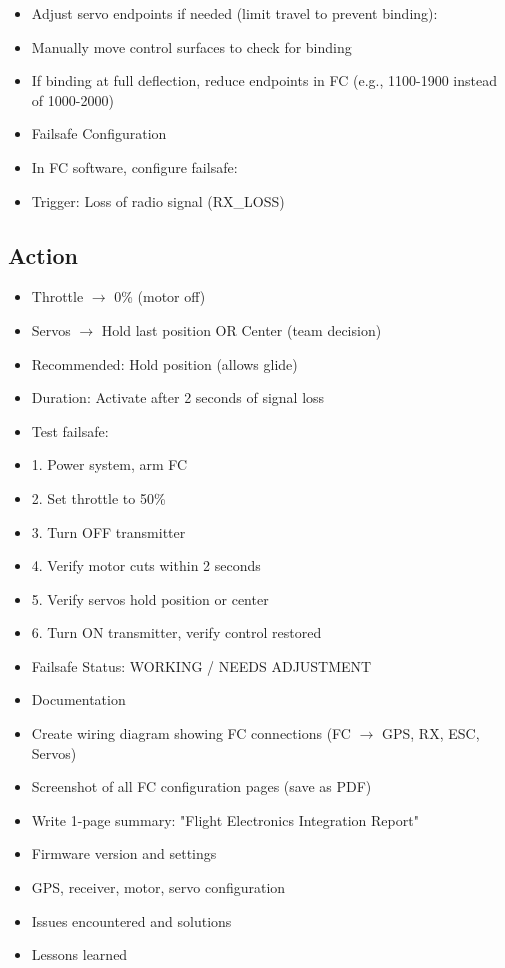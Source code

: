 \documentclass[11pt,letterpaper]{article}
\begin{document}
\begin{itemize}
  \item Adjust servo endpoints if needed (limit travel to prevent binding):
  \item Manually move control surfaces to check for binding
  \item If binding at full deflection, reduce endpoints in FC (e.g., 1100-1900 instead of 1000-2000)
\end{itemize}

\begin{itemize}
  \item Failsafe Configuration
  \item In FC software, configure failsafe:
  \item Trigger: Loss of radio signal (RX\_LOSS)
\end{itemize}

\subsection{Action}

\begin{itemize}
  \item Throttle $\rightarrow$ 0\% (motor off)
  \item Servos $\rightarrow$ Hold last position OR Center (team decision)
  \item Recommended: Hold position (allows glide)
  \item Duration: Activate after 2 seconds of signal loss
  \item Test failsafe:
  \item 1. Power system, arm FC
  \item 2. Set throttle to 50\%
  \item 3. Turn OFF transmitter
  \item 4. Verify motor cuts within 2 seconds
  \item 5. Verify servos hold position or center
  \item 6. Turn ON transmitter, verify control restored
  \item Failsafe Status: WORKING / NEEDS ADJUSTMENT
\end{itemize}

\begin{itemize}
  \item Documentation
  \item Create wiring diagram showing FC connections (FC $\rightarrow$ GPS, RX, ESC, Servos)
  \item Screenshot of all FC configuration pages (save as PDF)
  \item Write 1-page summary: "Flight Electronics Integration Report"
  \item Firmware version and settings
  \item GPS, receiver, motor, servo configuration
  \item Issues encountered and solutions
  \item Lessons learned
\end{itemize}
\end{document}
